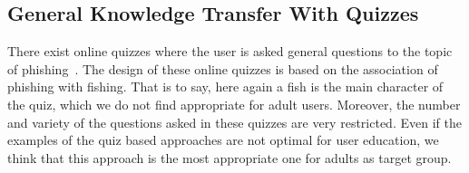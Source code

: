 \subsection{General Knowledge Transfer With Quizzes}
There exist online quizzes where the user is asked general questions to the topic of phishing~\cite{icicibank,onguardonline}. 
The design of these online quizzes is based on the association of phishing with fishing. 
That is to say, here again a fish is the main character of the quiz, which we do not find appropriate for adult users. 
Moreover, the number and variety of the questions asked in these quizzes are very restricted. 
Even if the examples of the quiz based approaches are not optimal for user education, we think that this approach is the most appropriate one for adults as target group.

